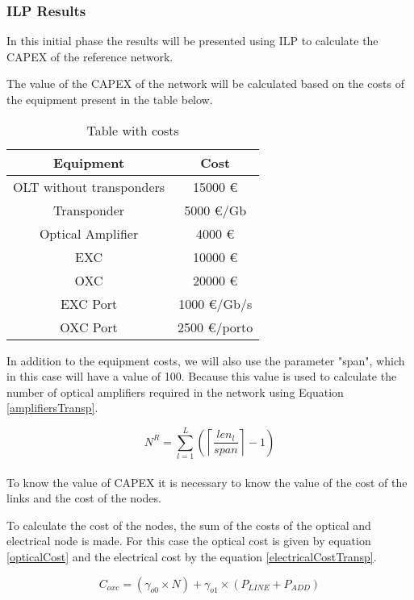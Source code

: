 \newpage
\subsubsection{ILP Results}

In this initial phase the results will be presented using ILP to calculate the CAPEX of the reference network.

The value of the CAPEX of the network will be calculated based on the costs of the equipment present in the table below.
\begin{table}[h!]
\centering
\begin{tabular}{|| c | c||}
 \hline
 Equipment & Cost \\
 \hline\hline
 OLT without transponders & 15000 \euro \\
 Transponder & 5000 \euro/Gb \\
 Optical Amplifier & 4000 \euro \\
 EXC & 10000 \euro \\
 OXC & 20000 \euro \\
 EXC Port & 1000 \euro /Gb/s\\
 OXC Port & 2500 \euro /porto \\
 \hline
\end{tabular}
\caption{Table with costs}
\label{table_cost2}
\end{table}
In addition to the equipment costs, we will also use the parameter "span", which in this case will have a value of 100.
Because this value is used to calculate the number of optical amplifiers required in the network using Equation \ref{amplifiersTransp}.

\begin{equation}
N^R = \sum\limits_{l=1}^L\left(\left\lceil\frac{len_l}{span}\right\rceil-1\right)
\label{amplifiersTransp}
\end{equation} \\

To know the value of CAPEX it is necessary to know the value of the cost of the links and the cost of the nodes.

To calculate the cost of the nodes, the sum of the costs of the optical and electrical node is made. For this case the optical cost is given by equation \ref{opticalCost} and the electrical cost by the equation \ref{electricalCostTransp}.


\begin{equation}
C_{oxc} = \left(\gamma_{o0} \times N \right) + \gamma_{o1} \times  \left(P_{LINE} + P_{ADD}\right)
\label{opticalCost}
\end{equation}	
	
